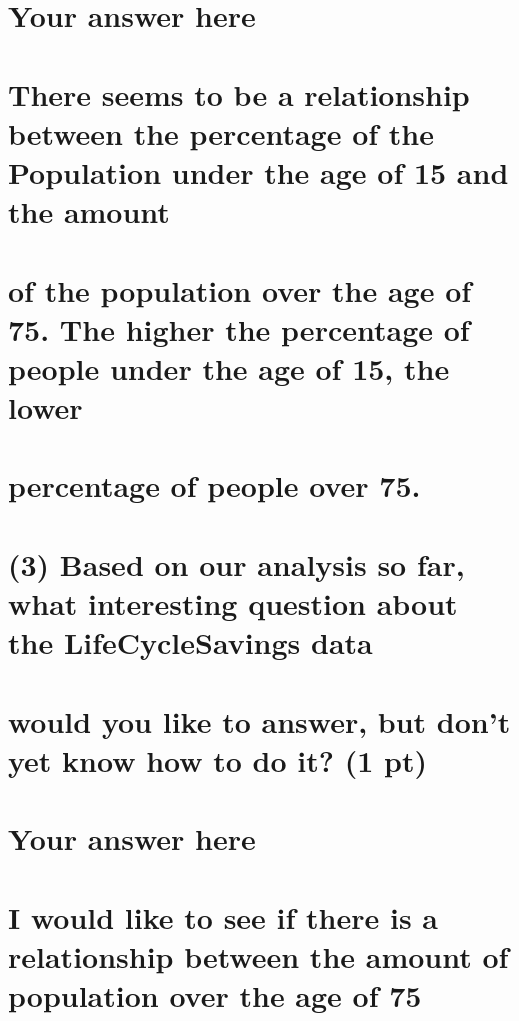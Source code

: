 \documentclass[]{article}
\begin{document}
\section{Your answer here}\label{your-answer-here-1}

\section{There seems to be a relationship between the percentage of the
Population under the age of 15 and the
amount}\label{there-seems-to-be-a-relationship-between-the-percentage-of-the-population-under-the-age-of-15-and-the-amount}

\section{of the population over the age of 75. The higher the percentage
of people under the age of 15, the
lower}\label{of-the-population-over-the-age-of-75.-the-higher-the-percentage-of-people-under-the-age-of-15-the-lower}

\section{percentage of people over
75.}\label{percentage-of-people-over-75.}

\section{(3) Based on our analysis so far, what interesting question
about the LifeCycleSavings
data}\label{based-on-our-analysis-so-far-what-interesting-question-about-the-lifecyclesavings-data}

\section{would you like to answer, but don't yet know how to do it? (1
pt)}\label{would-you-like-to-answer-but-dont-yet-know-how-to-do-it-1-pt}

\section{Your answer here}\label{your-answer-here-2}

\section{I would like to see if there is a relationship between the
amount of population over the age of
75}\label{i-would-like-to-see-if-there-is-a-relationship-between-the-amount-of-population-over-the-age-of-75}
\end{document}
